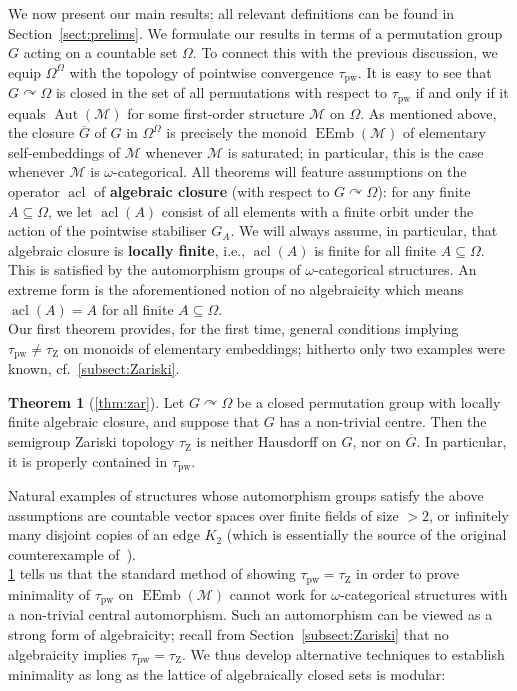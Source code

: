 \documentclass{article}
\theoremstyle{remark}
\theoremstyle{definition}
\newtheorem{thmx}{Theorem}
\def\acts{\curvearrowright}
\DeclareMathOperator{\acl}{acl}
\DeclareMathOperator{\Aut}{Aut}
\DeclareMathOperator{\EEmb}{EEmb}
\newcommand{\actson}{\curvearrowright}
\def\G{\overline{G}}
\newcommand{\M}[0]{\mathcal{M}}
\newcommand{\pw}[0]{\tau_{\mathrm{pw}}}
\newcommand{\zar}[0]{\tau_{\mathrm{Z}}}
\begin{document}
We now present our main results; all relevant definitions can be found in Section~\ref{sect:prelims}. We formulate our results in terms of {a permutation group}
$G$ acting on a countable set $\Omega$. To connect this with the previous discussion, we equip $\Omega^\Omega$ with the topology of pointwise convergence $\pw$. It is easy to see that $G\actson \Omega$ is closed in the set of all permutations with respect to $\pw$ if and only if it equals $\Aut(\M)$ for some first-order structure $\M$ on $\Omega$. As mentioned above, the closure $\G$ of $G$ in $\Omega^\Omega$ is precisely the monoid $\EEmb(\M)$ of elementary self-embeddings of $\M$ whenever $\M$ is saturated; in particular, this is the case whenever $\M$ is $\omega$-categorical. All theorems will feature assumptions on the operator $\acl$ of \textbf{algebraic closure} (with respect to $G\acts\Omega$): for any finite $A\subseteq \Omega$,  %
we let $\acl(A)$  consist of all elements with a finite orbit under the action of the pointwise stabiliser  $G_A$. We will always assume, in particular,   
that  algebraic closure is \textbf{locally finite}, i.e., $\acl(A)$ is finite for all finite $A\subseteq \Omega$.  This is satisfied by the automorphism groups of 
$\omega$-categorical structures. An extreme form is the aforementioned notion of no algebraicity which means $\acl(A)=A$ for all finite $A\subseteq \Omega$.\\

Our first theorem provides, for the first time, general conditions implying $\pw\neq\zar$ on monoids of elementary embeddings; hitherto  only two examples were known,  cf.~\cref{subsect:Zariski}.

\begin{thmx}[{\cref{thm:zar}}]\label{mainthm: a} Let $G\acts \Omega$ be a closed permutation group with locally finite algebraic closure, and suppose that $G$ has a non-trivial centre. %
Then the semigroup Zariski topology $\zar$ is neither Hausdorff on $G$, nor on $\G$. In particular, it is properly contained in $\pw$. 
\end{thmx}

Natural examples of  structures whose  automorphism groups satisfy the above assumptions are countable vector spaces over finite fields of size $>2$, %
or infinitely many disjoint copies of an edge $K_2$ (which is essentially the source of the original counterexample of~\cite{pinskerschindler}).\\

\cref{mainthm: a} tells us that the standard method of showing $\pw=\zar$ in order to prove minimality of $\pw$ on $\EEmb(\M)$  cannot work for $\omega$-categorical structures with a non-trivial 
central automorphism. 
Such an automorphism can be viewed as a strong
form of algebraicity; recall from Section~\ref{subsect:Zariski} that no algebraicity implies $\pw=\zar$. We thus develop  alternative techniques to establish minimality as long as the lattice of algebraically closed sets is modular:
\end{document}
